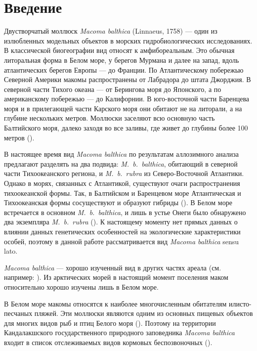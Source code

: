 \section{Введение}
Двустворчатый моллюск {\it Macoma balthica} (Linnaeus, 1758) --- один из излюбленных модельных объектов в морских гидробиологических исследованиях. 
В классической биогеографии вид относят к амфибореальным. 
Это обычная литоральная форма в Белом море, у берегов Мурмана и далее на запад, вдоль атлантических берегов Европы --- до Франции. 
По Атлантическому побережью Северной Америки макомы распространены от Лабрадора до штата Джорджия. 
В северной части Тихого океана --- от Берингова моря до Японского, а по американскому побережью --- до Калифорнии. 
В юго-восточной части Баренцева моря и в прилегающей части Карского моря они обитают  не на литорали, а на глубине нескольких метров. 
Моллюски заселяют всю основную часть Балтийского моря, далеко заходя во все заливы, где живет до глубины более 100 метров (\cite{Zacepin_Filatova_1968}).

В настоящее время вид {\it Macoma balthica} по результатам аллозимного анализа предлагают разделять на два подвида: {\it M.~b.~balthica}, обитающий в северной части Тихоокеанского региона, и {\it M.~b.~rubra} из Северо-Восточной Атлантики. 
Однако  в морях, связанных с  Атлантикой, существуют очаги распространения тихоокеанской формы. 
Так, в Балтийском и Баренцевом море Атлантическая и Тихоокеанская формы сосуществуют и образуют гибриды (\cite{Vainola_2003}). 
В Белом море встречается в основном {\it M.~b.~balthica}, и лишь в устье Онеги было обнаружено два экземпляра {\it M.~b.~rubra} (\cite{Nikula_et_al_2007}).
К настоящему моменту нет прямых данных о влиянии данных генетических особенностей на экологические характеристики особей, поэтому в данной работе рассматривается вид {\it Macoma balthica} sensu lato.

{\it Macoma balthica} --- хорошо изученный вид в других частях ареала (см. например: \cite{Segerstrale_1960, Lavoie_1970, Gilbert_1978, Vincent_et_al_1989, Hiddink_et_al_2002_predation_epifauna, Hiddink_et_al_2002_predation_infauna, Beukema_et_al_2009}). 
Из арктических морей в настоящий момент поселения маком относительно хорошо изучены лишь в Белом море.

В Белом море макомы относятся к наиболее многочисленным обитателям илисто-песчаных пляжей. 
Эти моллюски являются одним из основных пищевых объектов для многих видов рыб и птиц Белого моря (\cite{Azarov_1963, Percov_1963, Golcev_et_al_1997, Bianki_et_al_2003}). 
Поэтому на территории Кандалакшского государственного природного заповедника {\it Macoma balthica} входит в список отслеживаемых видов кормовых беспозвоночных (\cite{Nazarova_2003}).

